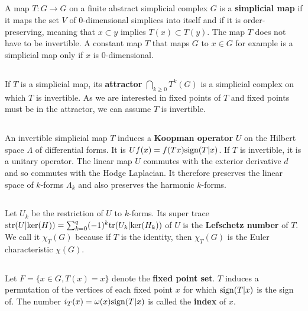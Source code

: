 \documentclass[12pt]{amsart}
\let\paragraph\subsection
\begin{document}
\paragraph{}
A map $T: G \to G$ on a finite abstract simplicial complex $G$ 
is a {\bf simplicial map} if it maps the set $V$ of $0$-dimensional simplices 
into itself and if it is order-preserving, meaning that $x \subset y$ implies $T(x) \subset T(y)$. 
The map $T$ does not have to be invertible. A constant map $T$ that maps $G$ to $x \in G$ 
for example is a simplicial map only if $x$ is $0$-dimensional.

\paragraph{}
If $T$ is a simplicial map, its {\bf attractor} $\bigcap_{k \geq 0} T^k(G)$ is 
a simplicial complex on which $T$ is invertible. As we are interested in fixed 
points of $T$ and fixed points must be in the attractor, we can assume $T$ is invertible.

\paragraph{}
An invertible simplicial map $T$ induces a {\bf Koopman operator} $U$ on the Hilbert space 
$\Lambda$ of differential forms. It is $U f(x) = f(Tx) {\rm sign}(T|x)$. 
If $T$ is invertible, it is a unitary operator. 
The linear map $U$ commutes with the exterior derivative $d$ and so 
commutes with the Hodge Laplacian. It therefore preserves the linear space of 
$k$-forms $\Lambda_k$ and also preserves the harmonic $k$-forms. 

\paragraph{}
Let $U_k$ be the restriction of $U$ to $k$-forms. Its super trace
${\rm str}(U|{\rm ker}(H)) = \sum_{k=0}^q (-1)^k {\rm tr}(U_k|{\rm ker}(H_k))$ 
of $U$ is the {\bf Lefschetz number} of $T$. We call it $\chi_T(G)$ because if
$T$ is the identity, then $\chi_T(G)$ is the Euler characteristic $\chi(G)$. 

\paragraph{}
Let $F=\{ x \in G, T(x)=x \}$ denote the {\bf fixed point set}.
$T$ induces a permutation of the vertices of each fixed point $x$ for which ${\rm sign}(T|x)$ 
is the sign of. The number $i_T(x) = \omega(x) {\rm sign}(T|x)$ is 
called the {\bf index} of $x$. 
\end{document}
